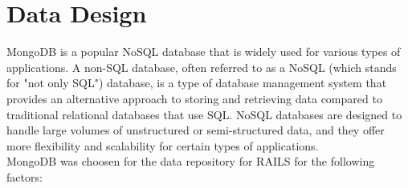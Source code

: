 \chapter{Data Design}
MongoDB is a popular NoSQL database that is widely used for various types of applications. A non-SQL database, often referred to as a NoSQL (which stands for "not only SQL") database, is a type of database management system that provides an alternative approach to storing and retrieving data compared to traditional relational databases that use \ac{SQL}. NoSQL databases are designed to handle large volumes of unstructured or semi-structured data, and they offer more flexibility and scalability for certain types of applications.\vspace{5mm} \\
MongoDB was choosen for the data repository for \ac{RAILS} for the following factors:
